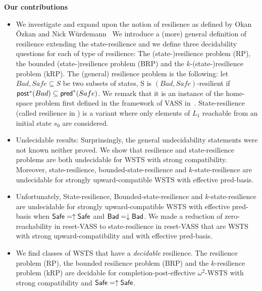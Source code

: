 \noindent
{\bf Our contributions}
\begin{itemize}
\item We investigate and expand upon the notion of resilience as defined by Okan Özkan and Nick Würdemann~\cite{DBLP:journals/corr/PrasadZ16,DBLP:journals/corr/abs-2108-00889,DBLP:conf/gg/Ozkan22}
We introduce a (more) general definition of resilience extending the state-resilience \cite{DBLP:journals/corr/PrasadZ16,DBLP:journals/corr/abs-2108-00889,DBLP:conf/gg/Ozkan22} and we define three decidability questions for each of type of resilience: The (state-)resilience problem (RP), the bounded (state-)resilience problem (BRP)
and the $k$-(state-)resilience problem (kRP). The (general) resilience problem is the following: let $Bad,Safe \subseteq S$ be two subsets of states, S is $(Bad,Safe)$-resilient if $\textsf{post}^*(Bad)	\subseteq \textsf{pred}^*(Safe)$. We remark that it is an instance of the home- space problem first defined in the framework of VASS in~\cite{DBLP:journals/corr/abs-2207-02697, memmi2023invariants}.
State-resilience (called resilience in \cite{DBLP:journals/corr/PrasadZ16,DBLP:journals/corr/abs-2108-00889,DBLP:conf/gg/Ozkan22}) is a variant where only elements of $L_1$ reachable from an initial state $s_0$ are considered.

\item Undecidable results: Surprinsingly, the general undecidability statements were not known neither proved. We show that resilience and state-resilience problems are both undecidable for WSTS with strong compatibility. Moreover, state-resilience,
bounded-state-resilience and
 $k$-state-resilience
are undecidable for strongly upward-compatible WSTS with effective pred-basis. 

\item Unfortunately, {\sc State-resilience},
{\sc Bounded-state-resilience} and
{\sc $k$-state-resilience}
are undecidable for strongly upward-compatible WSTS with effective pred-basis
when
$\textsf{Safe}=\uparrow \textsf{Safe}$
and $\textsf{Bad}=\downarrow \textsf{Bad}$. We made a reduction of zero-reachability in reset-VASS to state-resilience in reset-VASS that are WSTS with strong upward-compatibility and with effective pred-basis.


\item We find classes of WSTS that have a \emph{decidable} resilience. The resilience problem (RP), the bounded resilience problem (BRP)
and the $k$-resilience problem (kRP) are decidable for completion-post-effective $\omega^2$-WSTS with strong compatibility and $\textsf{Safe} = \uparrow \textsf{Safe}$.


\end{itemize}
